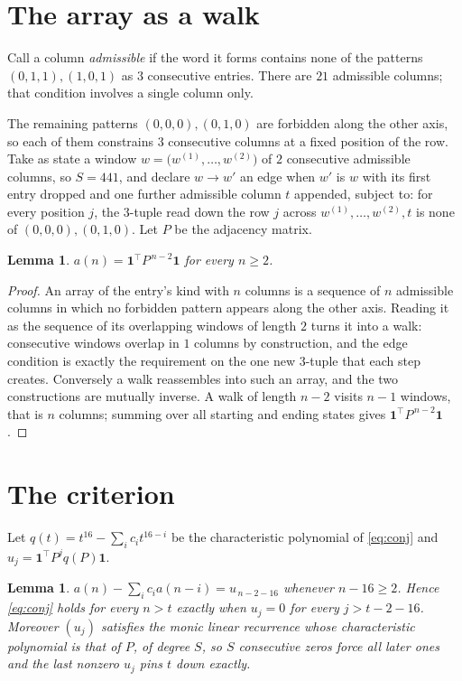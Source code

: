 \documentclass[11pt,a4paper]{article}
\theoremstyle{plain}
\newtheorem{lemma}[theorem]{Lemma}
\theoremstyle{definition}
\begin{document}
\section{The array as a walk}

Call a column \emph{admissible} if the word it forms contains none of the patterns
$(0,1,1), (1,0,1)$ as $3$ consecutive entries. There are $21$ admissible columns; that condition
involves a single column only.

The remaining patterns $(0,0,0), (0,1,0)$ are forbidden along the other axis, so each of them
constrains $3$ consecutive columns at a fixed position of the row. Take as state a
window $w=\bigl(w^{(1)},\dots,w^{(2)}\bigr)$ of $2$ consecutive admissible
columns, so $S=441$, and declare $w\to w'$ an edge when $w'$ is $w$ with its first entry
dropped and one further admissible column $t$ appended, subject to: for every position
$j$, the $3$-tuple read down the row $j$ across $w^{(1)},\dots,w^{(2)},t$
is none of $(0,0,0), (0,1,0)$. Let $P$ be the adjacency matrix.

\begin{lemma}\label{lem:walk}
$a(n)=\mathbf{1}^{\!\top}P^{\,n-2}\mathbf{1}$ for every $n\ge2$.
\end{lemma}

\begin{proof}
An array of the entry's kind with $n$ columns is a sequence of $n$ admissible columns in
which no forbidden pattern appears along the other axis. Reading it as the sequence of its
overlapping windows of length $2$ turns it into a walk: consecutive windows overlap in
$1$ columns by construction, and the edge condition is exactly the requirement on the one
new $3$-tuple that each step creates. Conversely a walk reassembles into such an array,
and the two constructions are mutually inverse. A walk of length $n-2$ visits $n-1$
windows, that is $n$ columns; summing over all starting and ending states gives
$\mathbf{1}^{\!\top}P^{\,n-2}\mathbf{1}$.
\end{proof}

\section{The criterion}

Let $q(t)=t^{16}-\sum_i c_i t^{16-i}$ be the characteristic polynomial of
\eqref{eq:conj} and $u_j=\mathbf{1}^{\!\top}P^{j}q(P)\mathbf{1}$.

\begin{lemma}\label{lem:crit}
$a(n)-\sum_i c_i a(n-i)=u_{\,n-2-16}$ whenever $n-16\ge2$. Hence
\eqref{eq:conj} holds for every $n>t$ exactly when $u_j=0$ for every
$j>t-2-16$. Moreover $(u_j)$ satisfies the monic linear recurrence whose
characteristic polynomial is that of $P$, of degree $S$, so $S$ consecutive zeros force all
later ones and the last nonzero $u_j$ pins $t$ down exactly.
\end{lemma}
\end{document}
